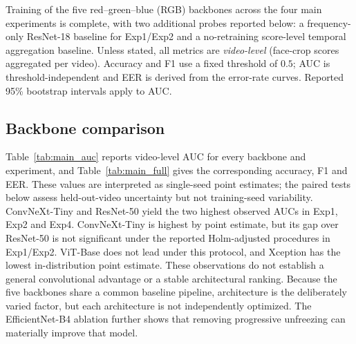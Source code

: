 Training of the five red--green--blue (RGB) backbones across the four main experiments is complete, with two additional probes reported below: a frequency-only ResNet-18 baseline for Exp1/Exp2 and a no-retraining score-level temporal aggregation baseline. Unless stated, all metrics are \emph{video-level} (face-crop scores aggregated per video). Accuracy and F1 use a fixed threshold of $0.5$; AUC is threshold-independent and EER is derived from the error-rate curves. Reported 95\% bootstrap intervals apply to AUC.

\subsection{Backbone comparison}
Table~\ref{tab:main_auc} reports video-level AUC for every backbone and experiment, and Table~\ref{tab:main_full} gives the corresponding accuracy, F1 and EER. These values are interpreted as single-seed point estimates; the paired tests below assess held-out-video uncertainty but not training-seed variability. ConvNeXt-Tiny and ResNet-50 yield the two highest observed AUCs in Exp1, Exp2 and Exp4. ConvNeXt-Tiny is highest by point estimate, but its gap over ResNet-50 is not significant under the reported Holm-adjusted procedures in Exp1/Exp2. ViT-Base does not lead under this protocol, and Xception has the lowest in-distribution point estimate. These observations do not establish a general convolutional advantage or a stable architectural ranking. Because the five backbones share a common baseline pipeline, architecture is the deliberately varied factor, but each architecture is not independently optimized. The EfficientNet-B4 ablation further shows that removing progressive unfreezing can materially improve that model.

